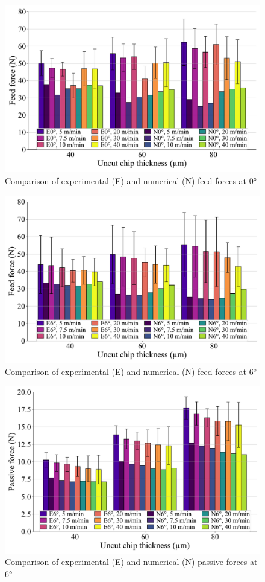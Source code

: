 \documentclass[final,5p,times,twocolumn]{elsarticle}
\begin{document}
\begin{figure}[h]
\centering
\includegraphics[width=\columnwidth]{Figures/Fy_0}
\caption{Comparison of experimental (E) and numerical (N) feed forces at 0°}
\label{Fy_0}
\end{figure}

\begin{figure}[h]
\centering
\includegraphics[width=\columnwidth]{Figures/Fy_6}
\caption{Comparison of experimental (E) and numerical (N) feed forces at 6°}
\label{Fy_6}
\end{figure}

\begin{figure}[h]
\centering
\includegraphics[width=\columnwidth]{Figures/Fz_6}
\caption{Comparison of experimental (E) and numerical (N) passive forces at 6°}
\label{Fz_6}
\end{figure}
\end{document}
